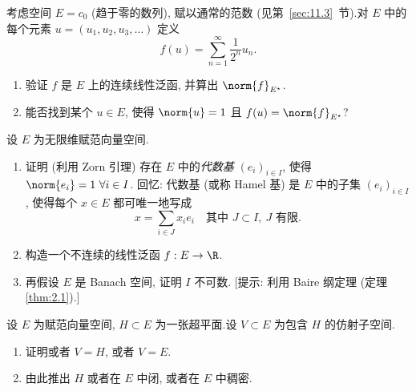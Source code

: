 \begin{exercise}
\label{exer:1.4}
考虑空间 $E=c_0$ (趋于零的数列), 赋以通常的范数 (见第~\ref{sec:11.3}~节).对 $E$ 中的每个元素
$u=(u_1,u_2,u_3,\dots)$ 定义
\begin{equation*}
f(u)=\sum_{n=1}^\infty\frac{1}{2^n}u_n.
\end{equation*}

\begin{enumerate}[label=\arabic*., leftmargin=2.2em, itemsep=0.25em]
	\item 验证 $f$ 是 $E$ 上的连续线性泛函, 并算出 $\norm{f}_{E^\star}$.
	\item 能否找到某个 $u\in E$, 使得 $\norm{u}=1$ 且 $f(u)=\norm{f}_{E^\star}$?
\end{enumerate}
\end{exercise}

\begin{exercise}
\label{exer:1.5}
设 $E$ 为无限维赋范向量空间.

\begin{enumerate}[label=\arabic*., leftmargin=2.2em, itemsep=0.25em]
	\item 证明 (利用 Zorn 引理) 存在 $E$ 中的\emph{代数基} $(e_i)_{i\in I}$, 使得
	      $\norm{e_i}=1\ \forall i\in I$.
	      回忆: 代数基 (或称 Hamel 基) 是 $E$ 中的子集 $(e_i)_{i\in I}$, 使得每个
	      $x\in E$ 都可唯一地写成
	      \begin{equation*}
	      x=\sum_{i\in J}x_ie_i\quad \text{其中 } J\subset I,\ J \text{ 有限}.
	      \end{equation*}
	\item 构造一个不连续的线性泛函 $f:E\to\R$.
	\item 再假设 $E$ 是 Banach 空间, 证明 $I$ 不可数.
	      [提示: 利用 
Baire 纲定理 (定理  \ref{thm:2.1}).]
\end{enumerate}
\end{exercise}

\begin{exercise}
\label{exer:1.6}
设 $E$ 为赋范向量空间, $H\subset E$ 为一张超平面.设 $V\subset E$ 为包含 $H$ 的仿射子空间.

\begin{enumerate}[label=\arabic*., leftmargin=2.2em, itemsep=0.25em]
	\item 证明或者 $V=H$, 或者 $V=E$.
	\item 由此推出 $H$ 或者在 $E$ 中闭, 或者在 $E$ 中稠密.
\end{enumerate}
\end{exercise}

